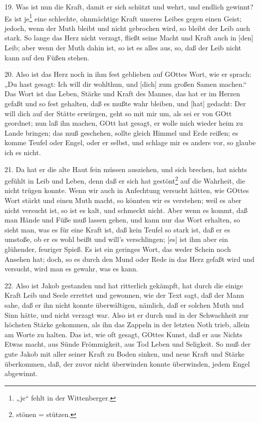 19. Was ist nun die Kraft, damit er sich schützt und wehrt, und endlich gewinnt? Es ist je\footnote{„je“ fehlt in der Wittenberger.} eine schlechte, ohnmächtige Kraft unseres Leibes gegen einen Geist; jedoch, wenn der Muth bleibt und nicht gebrochen wird, so bleibt der Leib auch stark. So lange das Herz nicht verzagt, fließt seine Macht und Kraft auch in [den] Leib; aber wenn der Muth dahin ist, so ist es alles aus, so, daß der Leib nicht kann auf den Füßen stehen.

20. Also ist das Herz noch in ihm fest geblieben auf GOttes Wort, wie er sprach: „Du hast gesagt: Ich will dir wohlthun, und [dich] zum großen Samen machen.“ Das Wort ist das Leben, Stärke und Kraft des Mannes, das hat er im Herzen gefaßt und so fest gehalten, daß es mußte wahr bleiben, und [hat] gedacht: Der will dich auf der Stätte erwürgen, geht so mit mir um, als sei er von GOtt geordnet; nun laß ihn machen, GOtt hat gesagt, er wolle mich wieder heim zu Lande bringen; das muß geschehen, sollte gleich Himmel und Erde reißen; es komme Teufel oder Engel, oder er selbst, und schlage mir es anders vor, so glaube ich es nicht.

21. Da hat er die alte Haut fein müssen ausziehen, und sich brechen, hat nichts gefühlt in Leib und Leben, denn daß er sich hat gestönt\footnote{stönen = stützen.} auf die Wahrheit, die nicht trügen konnte. Wenn wir auch in Anfechtung versucht hätten, wie GOttes Wort stärkt und einen Muth macht, so könnten wir es verstehen; weil es aber nicht versucht ist, so ist es kalt, und schmeckt nicht. Aber wenn es kommt, daß man Hände und Füße muß lassen gehen, und kann nur das Wort erhalten, so sieht man, was es für eine Kraft ist, daß kein Teufel so stark ist, daß er es umstoße, ob er es wohl beißt und will’s verschlingen; [es] ist ihm aber ein glühender, feuriger Spieß. Es ist ein geringes Wort, das weder Schein noch Ansehen hat; doch, so es durch den Mund oder Rede in das Herz gefaßt wird und versucht, wird man es gewahr, was es kann.

22. Also ist Jakob gestanden und hat ritterlich gekämpft, hat durch die einige Kraft Leib und Seele errettet und gewonnen, wie der Text sagt, daß der Mann sahe, daß er ihn nicht konnte überwältigen, nämlich, daß er solchen Muth und Sinn hätte, und nicht verzagt war. Also ist er durch und in der Schwachheit zur höchsten Stärke gekommen, als ihn das Zappeln in der letzten Noth trieb, allein am Worte zu halten. Das ist, wie oft gesagt, GOttes Kunst, daß er aus Nichts Etwas macht, aus Sünde Frömmigkeit, aus Tod Leben und Seligkeit. So muß der gute Jakob mit aller seiner Kraft zu
Boden sinken, und neue Kraft und Stärke überkommen, daß, der zuvor nicht überwinden konnte überwinden, jedem Engel abgewinnt.

